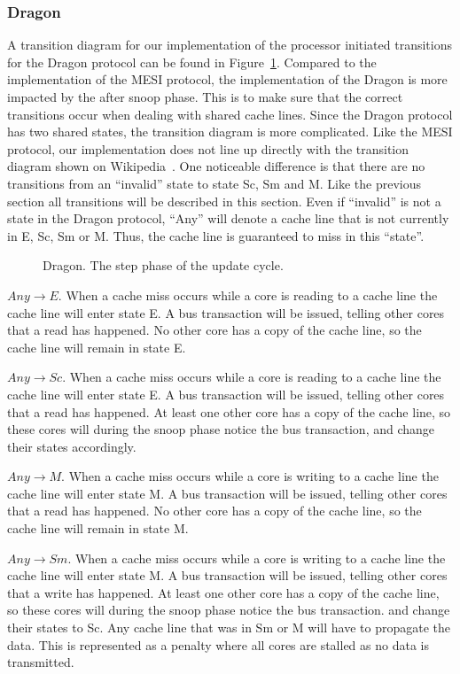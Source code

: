 \subsubsection{Dragon}
A transition diagram for our implementation of the processor initiated transitions for the Dragon protocol can be found in Figure~\ref{fig:dragon}.
Compared to the implementation of the MESI protocol, the implementation of the Dragon is more impacted by the after snoop phase.
This is to make sure that the correct transitions occur when dealing with shared cache lines.
Since the Dragon protocol has two shared states, the transition diagram is more complicated.
Like the MESI protocol, our implementation does not line up directly with the transition diagram shown on Wikipedia~\cite{dragon_wiki}.
One noticeable difference is that there are no transitions from an ``invalid'' state to state Sc, Sm and M.
Like the previous section all transitions will be described in this section.
Even if ``invalid'' is not a state in the Dragon protocol, ``Any'' will denote a cache line that is not currently in E, Sc, Sm or M.
Thus, the cache line is guaranteed to miss in this ``state''.


\begin{figure}[H]
    \centering
    \caption{Dragon. The step phase of the update cycle.}
    \label{fig:dragon}
\end{figure}

$Any \to E$.
When a cache miss occurs while a core is reading to a cache line the cache line will enter state E.
A bus transaction will be issued, telling other cores that a read has happened.
No other core has a copy of the cache line, so the cache line will remain in state E.

$Any \to Sc$.
When a cache miss occurs while a core is reading to a cache line the cache line will enter state E.
A bus transaction will be issued, telling other cores that a read has happened.
At least one other core has a copy of the cache line, so these cores will during the snoop phase notice the bus transaction, and change their states accordingly.

$Any \to M$.
When a cache miss occurs while a core is writing to a cache line the cache line will enter state M.
A bus transaction will be issued, telling other cores that a read has happened.
No other core has a copy of the cache line, so the cache line will remain in state M.

$Any \to Sm$.
When a cache miss occurs while a core is writing to a cache line the cache line will enter state M.
A bus transaction will be issued, telling other cores that a write has happened.
At least one other core has a copy of the cache line, so these cores will during the snoop phase notice the bus transaction.
and change their states to Sc.
Any cache line that was in Sm or M will have to propagate the data.
This is represented as a penalty where all cores are stalled as no data is transmitted.

